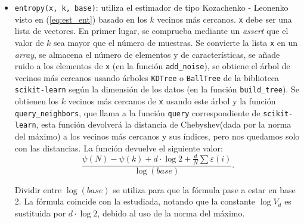 \documentclass[12pt,a4paper]{report} %
\theoremstyle{definition}
\begin{document}
\begin{itemize}
\item \texttt{entropy(x, k, base)}: utiliza el estimador de tipo Kozachenko - Leonenko visto en (\ref{eq:est_ent}) basado en los $k$ vecinos más cercanos. \texttt{x} debe ser una lista de vectores. En primer lugar, se comprueba mediante un \textit{assert} que el valor de $k$ sea mayor que el número de muestras. Se convierte la lista \texttt{x} en un \textit{array}, se almacena el número de elementos y de características, se añade ruido a los elementos de \texttt{x} (en la función \texttt{add\_noise}), se obtiene el árbol de vecinos más cercanos usando árboles \texttt{KDTree} o \texttt{BallTree} de la biblioteca \texttt{scikit-learn} según la dimensión de los datos (en la función \texttt{build\_tree}). Se obtienen los $k$ vecinos más cercanos de \texttt{x} usando este árbol y la función \texttt{query\_neighbors}, que llama a la función \texttt{query} correspondiente de \texttt{scikit-learn}, esta función devolverá la distancia de Chebyshev(dada por la norma del máximo) a los vecinos más cercanos y sus índices, pero nos quedamos solo con las distancias. La función devuelve el siguiente valor:\[
  \frac{\psi(N) - \psi(k) + d \cdot \log 2 + \frac{d}{N}\sum \varepsilon(i)}{\log(base)}.
  \]

  Dividir entre $\log (base)$ se utiliza para que la fórmula pase a estar en base 2. La fórmula coincide con la estudiada, notando que la constante $\log V_d$ es sustituida por $d \cdot \log 2$, debido al uso de la norma del máximo.


\end{itemize}
\end{document}
